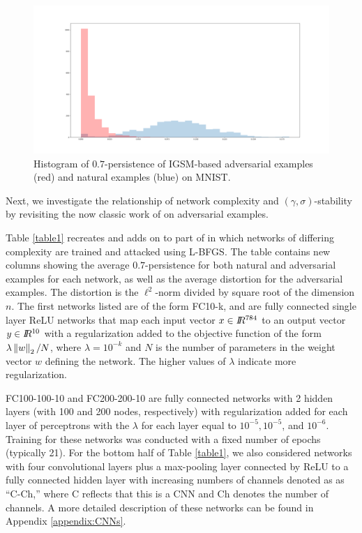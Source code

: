 \begin{figure}[!ht]
\centering
\includegraphics[trim=200 80 100 100, clip,width=.5\textwidth]{c3_figures/original_hist.png}
\caption{Histogram of $0.7$-persistence of IGSM-based adversarial examples (red) and natural examples (blue) on MNIST. %
}

\label{fig:IGSMpersistenceMNIST}
\end{figure}

Next, we investigate the relationship of network complexity and $(\gamma,\sigma)$-stability by revisiting the now classic work of \citet{szegedy2013} on adversarial examples. 

Table \ref{table1} recreates and adds on to part of \cite[Table 1]{szegedy2013} in which networks of differing complexity are trained and attacked using L-BFGS. The table contains new columns showing the average $0.7$-persistence for both natural and adversarial examples for each network, as well as the average distortion for the adversarial examples. The distortion is the $\ell^2$-norm divided by square root of the dimension $n$. The first networks listed are of the form FC10-k, and are fully connected single layer ReLU networks that map each input vector $x \in I\!\!R^{784}$ to an output vector $y \in I\!\!R^{10}$ with a regularization added to the objective function of the form $\lambda\left\Vert w \right\Vert_2/N$, where $\lambda = 10^{-k}$ and $N$ is the number of parameters in the weight vector $w$ defining the network. The higher values of $\lambda$ indicate more regularization.  

FC100-100-10 and FC200-200-10 are fully connected networks with 2 hidden layers (with 100 and 200 nodes, respectively) with regularization added for each layer of perceptrons with the $\lambda$ for each layer equal to $10^{-5}, 10^{-5}$, and  $10^{-6}$. Training for these networks was conducted with a fixed number of epochs (typically 21). For the bottom half of Table \ref{table1}, we also considered networks with four convolutional layers plus a max-pooling layer connected by ReLU to a fully connected hidden layer with increasing numbers of channels denoted as as ``C-Ch,'' where C reflects that this is a CNN and Ch denotes the number of channels. A more detailed description of these networks can be found in Appendix \ref{appendix:CNNs}.

